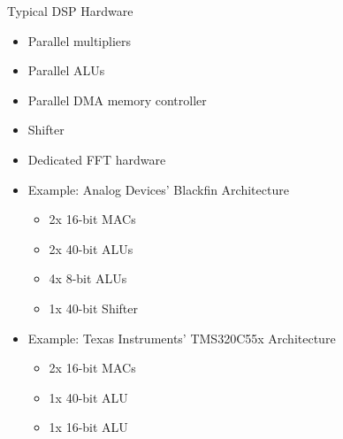 \documentclass{beamer}
\begin{document}
\begin{frame}{Typical DSP Hardware}
    \begin{itemize}
        \item Parallel multipliers
        \item Parallel ALUs
        \item Parallel DMA memory controller
        \item Shifter
        \item Dedicated FFT hardware
        \item Example: Analog Devices' Blackfin Architecture
            \begin{itemize}
                \item 2x 16-bit MACs
                \item 2x 40-bit ALUs
                \item 4x 8-bit ALUs
                \item 1x 40-bit Shifter
            \end{itemize}
        \item Example: Texas Instruments' TMS320C55x Architecture
            \begin{itemize}
                \item 2x 16-bit MACs
                \item 1x 40-bit ALU
                \item 1x 16-bit ALU
            \end{itemize}
    \end{itemize}
\end{frame}
\end{document}
